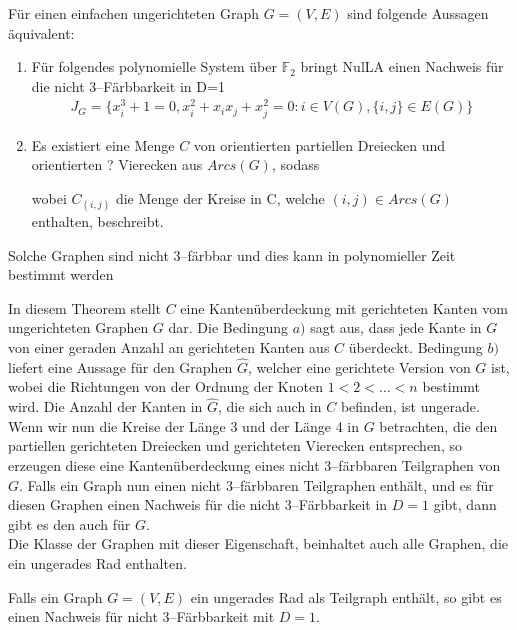 \begin{theorem} \label{3colorTheorem}
Für einen einfachen ungerichteten Graph $G=(V,E)$ sind folgende Aussagen äquivalent:
\begin{enumerate}
	\item Für folgendes polynomielle System über $\mathbb{F}_2$ bringt NulLA einen Nachweis für die nicht 3--Färbbarkeit in D=1
	\begin{align*}
	J_G = \{x_i^3+1=0,x_i^2+x_ix_j+x_j^2=0:i\in V(G),\{i,j\}\in E(G)\}
	\end{align*}
	\item Es existiert eine Menge $C$ von orientierten partiellen Dreiecken und orientierten ? Vierecken aus $Arcs(G)$, sodass 
	\begin{compactenum}[a)]
		\item  $\left|C_{(i,j)}\right|+\left|C_{(j,i)}\right| \equiv 0 \mod{2} \quad \forall \{i,j\} \in E$
		\item $\sum_{(i,j) \in Arcs(G), i < j} \left|C_{(i,j)}\right| \equiv 1 \mod{2}$
	\end{compactenum}
	wobei $C_{(i,j)}$ die Menge der Kreise in C, welche $(i,j) \in Arcs(G)$ enthalten, beschreibt.
\end{enumerate}
Solche Graphen sind nicht 3--färbbar und dies kann in polynomieller Zeit bestimmt werden
\end{theorem}


\noindent In diesem Theorem stellt $C$ eine Kantenüberdeckung mit gerichteten Kanten vom ungerichteten Graphen $G$ dar. Die Bedingung $a)$ sagt aus, dass jede Kante in $G$ von einer geraden Anzahl an gerichteten Kanten aus $C$ überdeckt. Bedingung $b)$ liefert eine Aussage für den Graphen $\widehat{G}$, welcher eine gerichtete Version von $G$ ist, wobei die Richtungen von der Ordnung der Knoten $1<2<\ldots <n$ bestimmt wird. Die Anzahl der Kanten in $\widehat{G}$, die sich auch in $C$ befinden, ist ungerade. Wenn wir nun die Kreise der Länge 3 und der Länge 4 in $G$ betrachten, die den partiellen gerichteten Dreiecken und gerichteten Vierecken entsprechen, so erzeugen diese eine Kantenüberdeckung eines nicht 3--färbbaren Teilgraphen von $G$. Falls ein Graph nun einen nicht 3--färbbaren Teilgraphen enthält, und es für diesen Graphen einen Nachweis für die nicht 3--Färbbarkeit in $D=1$ gibt, dann gibt es den auch für $G$. \\
Die Klasse der Graphen mit dieser Eigenschaft, beinhaltet auch alle Graphen, die ein ungerades Rad enthalten.

\begin{corollary}
Falls ein Graph $G=(V,E)$ ein ungerades Rad als Teilgraph enthält, so gibt es einen Nachweis für nicht 3--Färbbarkeit mit $D=1$.
\end{corollary} 


